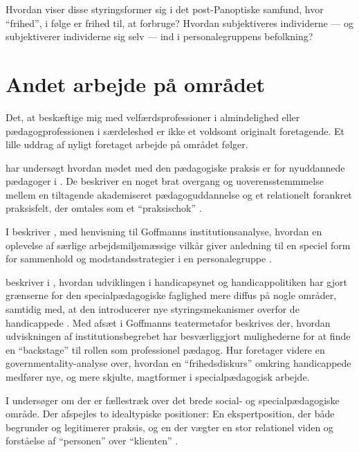 Hvordan viser disse styringsformer sig i det post-Panoptiske samfund, hvor “frihed”, i følge \citeauthor{baumanLiquidModernity2000} er frihed til, at forbruge?
Hvordan subjektiveres individerne — og subjektiverer individerne sig selv — ind i personalegruppens befolkning? 

\section{Andet arbejde på området}
Det, at beskæftige mig med velfærdsprofessioner i almindelighed eller pædagogprofessionen i særdeleshed er ikke et voldsomt originalt foretagende.
Et lille uddrag af nyligt foretaget arbejde på området følger.

\citeauthor{nielsenAttraktivPaPapiret2017} har undersøgt hvordan mødet med den pædagogiske praksis er for nyuddannede pædagoger i .
De beskriver en noget brat overgang og uoverensstemmmelse mellem en tiltagende akademiseret pædagoguddannelse og et relationelt forankret praksisfelt, der omtales som et “praksischok” \autocite{nielsenAttraktivPaPapiret2017}.

I  beskriver \citeauthor{dreyerespersenBekymrendeIdentiteterAnbragte2010}, med henvisning til Goffmanns institutionsanalyse, hvordan en oplevelse af særlige arbejdsmiljømæssige vilkår giver anledning til en speciel form for sammenhold og modstandsstrategier i en personalegruppe \autocite{dreyerespersenBekymrendeIdentiteterAnbragte2010}.

\citeauthor{hurFrigorelsensMagt2015} beskriver i , hvordan udviklingen i handicapsynet og handicappolitiken har gjort grænserne for den specialpædagogiske faglighed mere diffus på nogle områder, samtidig med, at den introducerer nye styringsmekanismer overfor de handicappede \autocite{hurFrigorelsensMagt2015}.
Med afsæt i Goffmanns teatermetafor beskrives der, hvordan udviskningen af institutionsbegrebet har besværliggjort mulighederne for at finde en “backstage” til rollen som professionel pædagog.
Hur foretager videre en governmentality-analyse over, hvordan en “frihedsdiskurs” omkring handicappede medfører nye, og mere skjulte, magtformer i specialpædagogisk arbejde.

I  undersøger \citeauthor{meyer-johansenFagligeOrienteringerSocialspecialpaedagogisk2018} om der er fællestræk over det brede social- og specialpædagogiske område.
Der afspejles to idealtypiske positioner: En ekspertposition, der både begrunder og legitimerer praksis, og en der vægter en stor relationel viden og forståelse af “personen” over “klienten” \autocite{meyer-johansenFagligeOrienteringerSocialspecialpaedagogisk2018}.


